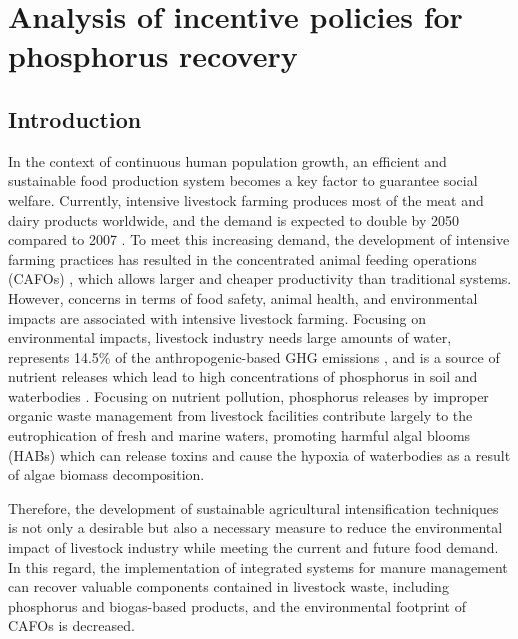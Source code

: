 \chapter{Analysis of incentive policies for phosphorus recovery}\label{ch:Policies}
\begin{refsection}[referencesCh5]
\section{Introduction}
In the context of continuous human population growth, an efficient and sustainable food production system becomes a key factor to guarantee social welfare. Currently, intensive livestock farming produces most of the meat and dairy products worldwide, and the demand is expected to double by 2050 compared to 2007 \citep{livestock_projection}. To meet this increasing demand, the development of intensive farming practices has resulted in the concentrated animal feeding operations (CAFOs) \citep{animal_unit_definition}, which allows larger and cheaper productivity than traditional systems. However, concerns in terms of food safety, animal health, and environmental impacts are associated with intensive livestock farming. Focusing on environmental impacts, livestock industry needs large amounts of water, represents 14.5\% of the anthropogenic-based GHG emissions \citep{eisler_agriculture:_2014}, and is a source of nutrient releases which lead to high concentrations of phosphorus in soil and waterbodies \citep{Sampat2017}. Focusing on nutrient pollution, phosphorus releases by improper organic waste management from livestock facilities contribute largely to the eutrophication of fresh and marine waters, promoting harmful algal blooms (HABs) which can release toxins and cause the hypoxia of waterbodies as a result of algae biomass decomposition. 

Therefore, the development of sustainable agricultural intensification techniques is not only a desirable but also a necessary measure to reduce the environmental impact of livestock industry while meeting the current and future food demand. In this regard, the implementation of integrated systems for manure management can recover valuable components contained in livestock waste, including phosphorus and biogas-based products, and the environmental footprint of CAFOs is decreased.


\end{refsection}
